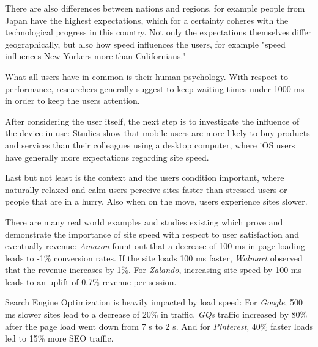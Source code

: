 There are also differences between nations and regions, for example people from Japan have the highest expectations, which for a certainty coheres with the technological progress in this country.
Not only the expectations themselves differ geographically, but also how speed influences the users, for example "speed influences New Yorkers more than Californians."



What all users have in common is their human psychology. With respect to performance, researchers generally suggest to keep waiting times under 1000 ms in order to keep the users attention.

After considering the user itself, the next step is to investigate the influence of the device in use: Studies show that mobile users are more likely to buy products and services than their colleagues using a desktop computer, where iOS users have generally more expectations regarding site speed.
 
Last but not least is the context and the users condition important, where naturally relaxed and calm users perceive sites faster than stressed users or people that are in a hurry.
Also when on the move, users experience sites slower.


There are many real world examples and studies existing which prove and demonstrate the importance of site speed with respect to user satisfaction and eventually revenue:
\textit{Amazon} fount out that a decrease of 100 ms in page loading leads to -1\% conversion rates.
If the site loads 100 ms faster, \textit{Walmart} observed that the revenue increases by 1\%.
For \textit{Zalando}, increasing site speed by 100 ms leads to an uplift of 0.7\% revenue per session.

Search Engine Optimization is heavily impacted by load speed:
For \textit{Google}, 500 ms slower sites lead to a decrease of 20\% in traffic.
\textit{GQs} traffic increased by 80\% after the page load went down from 7 s to 2 s.
And for \textit{Pinterest}, 40\% faster loads led to 15\% more SEO traffic.



